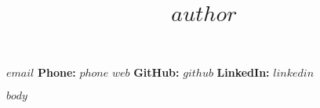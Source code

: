 \documentclass[11pt,a4paper]{article}
\title{\textcolor{devblue}{\large $author$}}
\author{}
\date{}
\begin{document}
\maketitle

\vspace{-1em}
\noindent\href{mailto:$email$}{\texttt{$email$}} \hspace{1em}
\textbf{Phone:} $phone$ \hspace{1em}
\href{https://$web$}{\texttt{$web$}} \hspace{1em}
\textbf{GitHub:} \href{https://github.com/$github$}{\texttt{$github$}} \hspace{1em}
\textbf{LinkedIn:} \href{https://linkedin.com/in/$linkedin$}{\texttt{$linkedin$}}

\vspace{1em}

$body$
\end{document}
